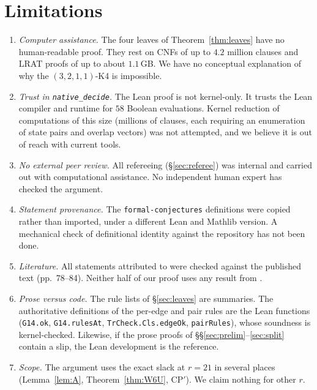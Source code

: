 \documentclass[11pt]{amsart}
\theoremstyle{definition}
\begin{document}
\section{Limitations}\label{sec:limits}
\begin{enumerate}
\item \emph{Computer assistance.} The four leaves of Theorem~\ref{thm:leaves} have no human-readable proof. They rest on CNFs of up to $4.2$ million clauses and LRAT proofs of up to about $1.1$\,GB. We have no conceptual explanation of why the $(3,2,1,1)$-K4 is impossible.
\item \emph{Trust in \texttt{native\_decide}.} The Lean proof is not kernel-only. It trusts the Lean compiler and runtime for $58$ Boolean evaluations. Kernel reduction of computations of this size (millions of clauses, each requiring an enumeration of state pairs and overlap vectors) was not attempted, and we believe it is out of reach with current tools.
\item \emph{No external peer review.} All refereeing (\S\ref{sec:referee}) was internal and carried out with computational assistance. No independent human expert has checked the argument.
\item \emph{Statement provenance.} The \texttt{formal-conjectures} definitions were copied rather than imported, under a different Lean and Mathlib version. A mechanical check of definitional identity against the repository has not been done.
\item \emph{Literature.} All statements attributed to \cite{EHT91} were checked against the published text (pp.~78--84). Neither half of our proof uses any result from \cite{EHT91}.
\item \emph{Prose versus code.} The rule lists of \S\ref{sec:leaves} are summaries. The authoritative definitions of the per-edge and pair rules are the Lean functions (\texttt{G14.ok}, \texttt{G14.rulesAt}, \texttt{TrCheck.Cls.edgeOk}, \texttt{pairRules}), whose soundness is kernel-checked. Likewise, if the prose proofs of \S\S\ref{sec:prelim}--\ref{sec:split} contain a slip, the Lean development is the reference.
\item \emph{Scope.} The argument uses the exact slack at $r=21$ in several places (Lemma~\ref{lem:A}, Theorem~\ref{thm:W6U}, CP$'$). We claim nothing for other $r$.
\end{enumerate}

\end{document}
